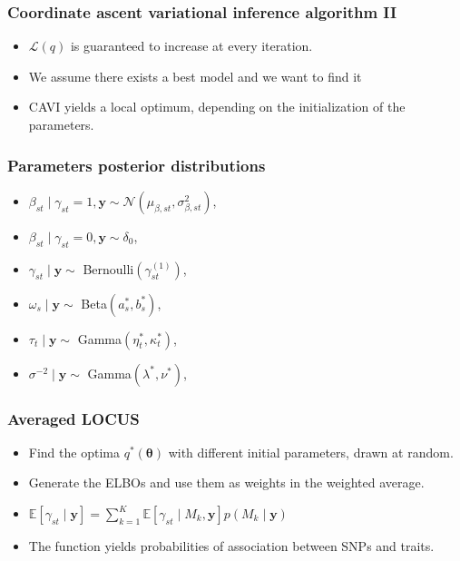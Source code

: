 \documentclass{beamer}
\begin{document}
\begin{frame}
\frametitle{Coordinate ascent variational inference algorithm II}
\begin{itemize}
\item $\mathcal{L}(q)$ is guaranteed to increase at every iteration.
\item We assume there exists a best model and we want to find it
\item CAVI yields a local optimum, depending on the initialization of the parameters.
\end{itemize}
\end{frame}

\begin{frame}
\frametitle{Parameters posterior distributions}
\begin{itemize}
\item $\beta_{st} \mid \gamma_{st} = 1, \boldsymbol{y} \sim \mathcal{N}\left(\mu_{\beta,st},\sigma_{\beta,st}^2\right)$,
\item $\beta_{st} \mid \gamma_{st} = 0, \boldsymbol{y} \sim \delta_0$,
\item $\gamma_{st} \mid \boldsymbol{y} \sim $ Bernoulli$(\gamma_{st}^{(1)})$,
\item $\omega_s \mid \boldsymbol{y} \sim $ Beta$(a^*_s, b^*_s)$,
\item $\tau_t \mid \boldsymbol{y} \sim $ Gamma$(\eta_t^*, \kappa_t^*)$,
\item $\sigma^{-2} \mid \boldsymbol{y} \sim $ Gamma$(\lambda^*,\nu^*)$,
\end{itemize}
\end{frame}

\begin{frame}
\frametitle{Averaged LOCUS}
\begin{itemize}
\item Find the optima $q^*(\boldsymbol{\theta})$ with different initial parameters, drawn at random.
\item Generate the ELBOs and use them as weights in the weighted average.
\item $\mathbb{E}\left[\gamma_{st}\mid \boldsymbol{y}\right]= \sum_{k=1}^K \mathbb{E}\left[\gamma_{st}\mid M_k,\boldsymbol{y}\right]p(M_k\mid\boldsymbol{y})$
\item The function yields probabilities of association between SNPs and traits.
\end{itemize}
\end{frame}
\end{document}
